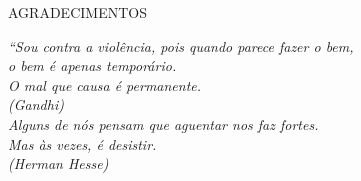 \documentclass[
	12pt,				%
	openright,			%
	oneside,
	a4paper,			%
	english,			%
	french,				%
	spanish,			%
	brazil				%
	]{abntex2}
\begin{document}
\begin{folhadeaprovacao}
  \begin{center}
    {\ABNTEXchapterfont\large\imprimirautor}
    \vspace*{\fill}\vspace*{\fill}
    \begin{center}
      \ABNTEXchapterfont\bfseries\Large\imprimirtitulo
    \end{center}
    \vspace*{\fill}
    \hspace{.45\textwidth}
    \begin{minipage}{.5\textwidth}
        \imprimirpreambulo
    \end{minipage}%
    \vspace*{\fill}
   \end{center}
  
   \begin{center}
    \vspace*{0.5cm}
    {\large\imprimirlocal}
    \par
    {\large\imprimirdata}
    \vspace*{1cm}
  \end{center}  
\end{folhadeaprovacao}






\begin{agradecimentos}

AGRADECIMENTOS

\end{agradecimentos}





\begin{epigrafe}
    \vspace*{\fill}
	\begin{flushright}
		\textit{``Sou contra a violência, pois quando parece fazer o bem,\\
			o bem é apenas temporário.\\
			O mal que causa é permanente. \\
			(Gandhi)\\ }
		\textit{Alguns de nós pensam que aguentar nos faz fortes. \\
			Mas às vezes, é desistir.\\
			(Herman Hesse)}
	\end{flushright}
\end{epigrafe}
\end{document}
